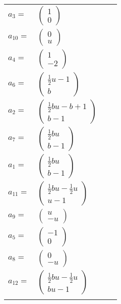 \documentclass[1p]{elsarticle_modified}
\theoremstyle{definition}
\begin{document}
\begin{tabular}{m{7pt} m{180pt} m{7pt} m{180pt} }
\flushright $a_{3}=$&$\begin{pmatrix}1\\0\end{pmatrix}$ \\
\flushright $a_{10}=$&$\begin{pmatrix}0\\u\end{pmatrix}$ \\
\flushright $a_{4}=$&$\begin{pmatrix}1\\-2\end{pmatrix}$ \\
\flushright $a_{6}=$&$\begin{pmatrix}\frac{1}{2} u-1\\b\end{pmatrix}$ \\
\flushright $a_{2}=$&$\begin{pmatrix}\frac{1}{2} b u- b+1\\b-1\end{pmatrix}$ \\
\flushright $a_{7}=$&$\begin{pmatrix}\frac{1}{2} b u\\b-1\end{pmatrix}$ \\
\flushright $a_{1}=$&$\begin{pmatrix}\frac{1}{2} b u\\b-1\end{pmatrix}$ \\
\flushright $a_{11}=$&$\begin{pmatrix}\frac{1}{2} b u-\frac{1}{2} u\\u-1\end{pmatrix}$ \\
\flushright $a_{9}=$&$\begin{pmatrix}u\\- u\end{pmatrix}$ \\
\flushright $a_{5}=$&$\begin{pmatrix}-1\\0\end{pmatrix}$ \\
\flushright $a_{8}=$&$\begin{pmatrix}0\\- u\end{pmatrix}$ \\
\flushright $a_{12}=$&$\begin{pmatrix}\frac{1}{2} b u-\frac{1}{2} u\\b u-1\end{pmatrix}$\\&\end{tabular}
\end{document}
